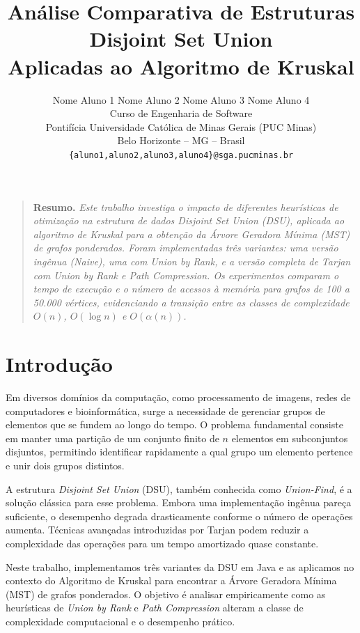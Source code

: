 \documentclass[12pt]{article}
\title{Análise Comparativa de Estruturas Disjoint Set Union\\Aplicadas ao Algoritmo de Kruskal}
\author{
  Nome Aluno 1\inst{1} \quad Nome Aluno 2\inst{1} \quad Nome Aluno 3\inst{1} \quad Nome Aluno 4\inst{1}\\[6pt]
  \inst{1}Curso de Engenharia de Software\\
  Pontifícia Universidade Católica de Minas Gerais (PUC Minas)\\
  Belo Horizonte -- MG -- Brasil\\[4pt]
  \texttt{\{aluno1,aluno2,aluno3,aluno4\}@sga.pucminas.br}
}
\newenvironment{resumo}{\begin{quote}\textbf{Resumo.} \itshape}{\end{quote}}
\begin{document}
\maketitle

\begin{resumo}
Este trabalho investiga o impacto de diferentes heurísticas de otimização na estrutura de dados Disjoint Set Union (DSU), aplicada ao algoritmo de Kruskal para a obtenção da Árvore Geradora Mínima (MST) de grafos ponderados. Foram implementadas três variantes: uma versão ingênua (Naive), uma com Union by Rank, e a versão completa de Tarjan com Union by Rank e Path Compression. Os experimentos comparam o tempo de execução e o número de acessos à memória para grafos de 100 a 50.000 vértices, evidenciando a transição entre as classes de complexidade $O(n)$, $O(\log n)$ e $O(\alpha(n))$.
\end{resumo}

\section{Introdução}

Em diversos domínios da computação, como processamento de imagens, redes de computadores e bioinformática, surge a necessidade de gerenciar grupos de elementos que se fundem ao longo do tempo. O problema fundamental consiste em manter uma partição de um conjunto finito de $n$ elementos em subconjuntos disjuntos, permitindo identificar rapidamente a qual grupo um elemento pertence e unir dois grupos distintos.

A estrutura \emph{Disjoint Set Union} (DSU), também conhecida como \emph{Union-Find}, é a solução clássica para esse problema. Embora uma implementação ingênua pareça suficiente, o desempenho degrada drasticamente conforme o número de operações aumenta. Técnicas avançadas introduzidas por Tarjan \cite{tarjan1975} podem reduzir a complexidade das operações para um tempo amortizado quase constante.

Neste trabalho, implementamos três variantes da DSU em Java e as aplicamos no contexto do Algoritmo de Kruskal para encontrar a Árvore Geradora Mínima (MST) de grafos ponderados. O objetivo é analisar empiricamente como as heurísticas de \emph{Union by Rank} e \emph{Path Compression} alteram a classe de complexidade computacional e o desempenho prático.

\end{document}
